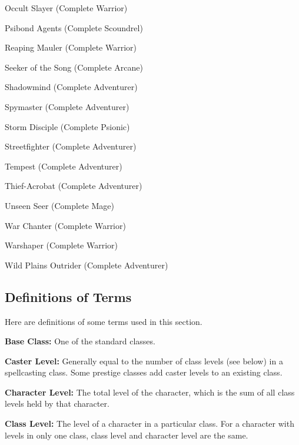 \begin{itemize*}
\item Occult Slayer (Complete Warrior)
\item Psibond Agents (Complete Scoundrel)
\item Reaping Mauler (Complete Warrior)
\item Seeker of the Song (Complete Arcane)
\item Shadowmind (Complete Adventurer)
\item Spymaster (Complete Adventurer)
\item Storm Disciple (Complete Psionic)
\item Streetfighter (Complete Adventurer)
\item Tempest (Complete Adventurer)
\item Thief-Acrobat (Complete Adventurer)
\item Unseen Seer (Complete Mage)
\item War Chanter (Complete Warrior)
\item Warshaper (Complete Warrior)
\item Wild Plains Outrider (Complete Adventurer)
\end{itemize*}

\subsection{Definitions of Terms}
Here are definitions of some terms used in this section.

\textbf{Base Class:} One of the standard classes.

\textbf{Caster Level:} Generally equal to the number of class levels (see below) in a spellcasting class. Some prestige classes add caster levels to an existing class.

\textbf{Character Level:} The total level of the character, which is the sum of all class levels held by that character.

\textbf{Class Level:} The level of a character in a particular class. For a character with levels in only one class, class level and character level are the same.
















